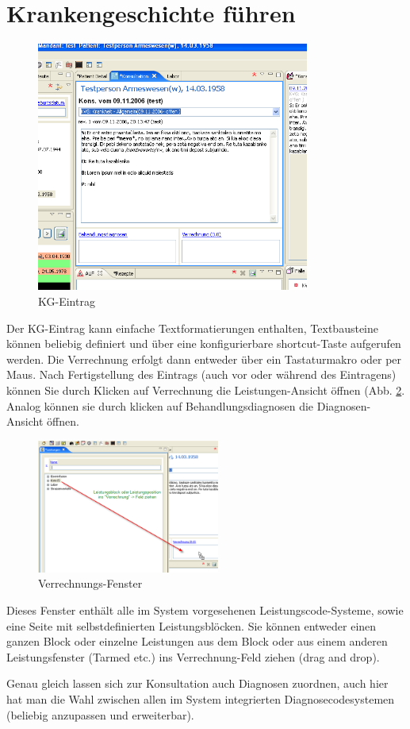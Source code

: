 \section{Krankengeschichte führen}
\begin{figure}
    \begin{center}
	   \includegraphics[width=0.8\textwidth]{images/einf6}
    	\caption{KG-Eintrag}
	   \label{fig:KG}
    \end{center}
\end{figure}
Der KG-Eintrag kann einfache Textformatierungen enthalten, Textbausteine können
beliebig definiert und über eine konfigurierbare shortcut-Taste aufgerufen werden. Die Verrechnung erfolgt dann entweder über ein Tastaturmakro oder per Maus.
Nach Fertigstellung des Eintrags (auch vor oder während des Eintragens) können
Sie durch Klicken auf \glqq Verrechnung\grqq{} die Leistungen-Ansicht öffnen
(Abb. \ref{fig:Verrechnung}. Analog können sie durch klicken auf
\glqq Behandlungsdiagnosen\grqq{} die Diagnosen-Ansicht öffnen.\bigskip
\begin{figure}[ht]
	\includegraphics[width=6cm]{images/einf7}
	\caption{Verrechnungs-Fenster}
	\label{fig:Verrechnung}
\end{figure}
Dieses Fenster enthält alle im System vorgesehenen Leistungscode-Systeme, sowie eine Seite mit selbstdefinierten Leistungsblöcken.
Sie können entweder einen ganzen Block oder einzelne Leistungen aus dem Block oder aus einem anderen Leistungsfenster (Tarmed etc.) ins \glqq Verrechnung\grqq{}-Feld ziehen (drag and drop).

Genau gleich lassen sich zur Konsultation auch Diagnosen zuordnen, auch hier hat man die Wahl zwischen allen im System integrierten Diagnosecodesystemen (beliebig anzupassen und erweiterbar).

\clearpage
